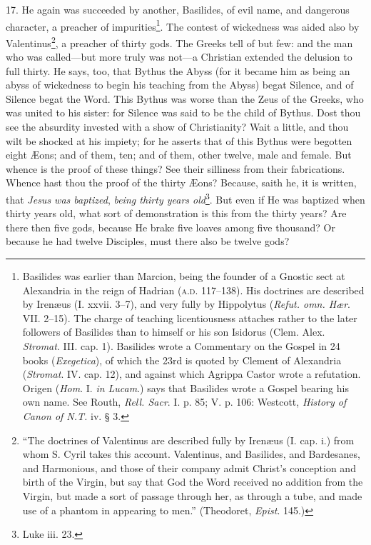 17. He again was succeeded by another, Basilides, of evil name, and dangerous character, a preacher of impurities\footnote{Basilides was earlier than Marcion, being the founder of a Gnostic sect at Alexandria in the reign of Hadrian (\textsc{a.d.} 117–138). His doctrines are described by Irenæus (I. xxvii. 3–7), and very fully by Hippolytus (\emph{Refut. omn. Hær}. VII. 2–15). The charge of teaching licentiousness attaches rather to the later followers of Basilides than to himself or his son Isidorus (Clem. Alex. \emph{Stromat}. III. cap. 1). Basilides wrote a Commentary on the Gospel in 24 books (\emph{Exegetica}), of which the 23rd is quoted by Clement of Alexandria (\emph{Stromat}. IV. cap. 12), and against which Agrippa Castor wrote a refutation. Origen (\emph{Hom}. I. \emph{in Lucam}.) says that Basilides wrote a Gospel bearing his own name. See Routh, \emph{Rell. Sacr}. I. p. 85; V. p. 106: Westcott, \emph{History of Canon of N.T.} iv. § 3.}. The contest of wickedness was aided also by Valentinus\footnote{“The doctrines of Valentinus are described fully by Irenæus (I. cap. i.) from whom S. Cyril takes this account. Valentinus, and Basilides, and Bardesanes, and Harmonious, and those of their company admit Christ’s conception and birth of the Virgin, but say that God the Word received no addition from the Virgin, but made a sort of passage through her, as through a tube, and made use of a phantom in appearing to men.” (Theodoret, \emph{Epist}. 145.)}, a preacher of thirty gods. The Greeks tell of but few: and the man who was called—but more truly was not—a Christian extended the delusion to full thirty. He says, too, that Bythus the Abyss (for it became him as being an abyss of wickedness to begin his teaching from the Abyss) begat Silence, and of Silence begat the Word. This Bythus was worse than the Zeus of the Greeks, who was united to his sister: for Silence was said to be the child of Bythus. Dost thou see the absurdity invested with a show of Christianity? Wait a little, and thou wilt be shocked at his impiety; for he asserts that of this Bythus were begotten eight Æons; and of them, ten; and of them, other twelve, male and female. But whence is the proof of these things? See their silliness from their fabrications. Whence hast thou the proof of the thirty Æons? Because, saith he, it is written, that \emph{Jesus was baptized}, \emph{being thirty years old}\footnote{Luke iii. 23.}. But even if He was baptized when thirty years old, what sort of demonstration is this from the thirty years? Are there then five gods, because He brake five loaves among five thousand? Or because he had twelve Disciples, must there also be twelve gods?

